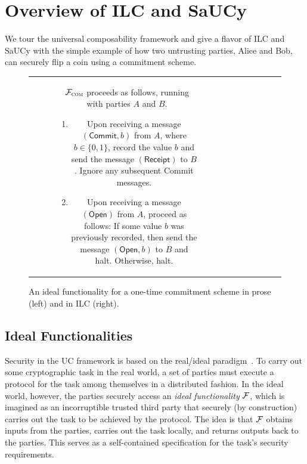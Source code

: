 \section{Overview of ILC and SaUCy}
\label{sec:background}

We tour the universal composability framework and give a flavor of ILC and SaUCy
with the simple example of how two untrusting parties, Alice and Bob, can
securely flip a coin using a commitment scheme.

\begin{figure}[t]
\centering
\begin{tabular}{c|c}
\begin{subfigure}{.575\textwidth}
    $\mathcal{{F}}_{\textsc{com}}$ proceeds as follows, running with parties $A$ and
  $B$.
    \begin{enumerate}
        \item Upon receiving a message $(\mathsf{Commit}, b)$ from $A$, where $b
          \in \{ 0, 1 \}$, record the value $b$ and send the message
          $(\mathsf{Receipt})$ to $B$. Ignore any subsequent \textsf{Commit}
          messages.
        \item Upon receiving a message $(\mathsf{Open})$ from $A$, proceed as
          follows: If some value $b$ was previously recorded, then send the
          message $(\mathsf{Open}, b)$ to $B$ and halt. Otherwise, halt.
    \end{enumerate}
\label{func:com}
\end{subfigure}\hspace{0.02\textwidth}
&\hspace{0.02\textwidth}
\begin{subfigure}{.35\textwidth}
  
\end{subfigure}
\end{tabular}
\caption{An ideal functionality for a one-time commitment scheme in prose (left)
  and in ILC (right).}
\label{func:com}
\end{figure}

\subsection{Ideal Functionalities}
\label{subsec:functionalities}

Security in the UC framework is based on the real/ideal
paradigm~\cite{goldreich1987play}. To carry out some cryptographic task in the
real world, a set of parties must execute a protocol for the task among
themselves in a distributed fashion. In the ideal world, however, the parties
securely access an \emph{ideal functionality} $\mathcal{{F}}$, which is imagined as an
incorruptible trusted third party that securely (by construction) carries out
the task to be achieved by the protocol. The idea is that $\mathcal{{F}}$ obtains
inputs from the parties, carries out the task locally, and returns outputs back
to the parties. This serves as a self-contained specification
for the task's security requirements.\smallskip

